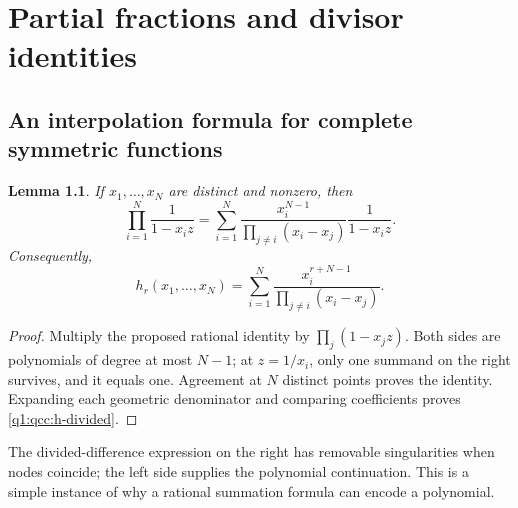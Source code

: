 \documentclass[11pt,a4paper,oneside,openany]{book}
\newtheorem{lemma}[theorem]{Lemma}
\theoremstyle{definition}
\theoremstyle{remark}
\begin{document}
\chapter{Partial fractions and divisor identities}
\label{q1:qcc:divisor}
\section{An interpolation formula for complete symmetric functions}
\begin{lemma}\label{q1:qcc:partial-fraction}
If \(x_1,\ldots,x_N\) are distinct and nonzero, then
\begin{equation}\label{q1:qcc:partial-fraction-formula}
 \prod_{i=1}^N\frac1{1-x_i z}
 =\sum_{i=1}^N\frac{x_i^{N-1}}{\prod_{j\ne i}(x_i-x_j)}\frac1{1-x_i z}.
\end{equation}
Consequently,
\begin{equation}\label{q1:qcc:h-divided}
 h_r(x_1,\ldots,x_N)
 =\sum_{i=1}^N\frac{x_i^{r+N-1}}{\prod_{j\ne i}(x_i-x_j)}.
\end{equation}
\end{lemma}
\begin{proof}
Multiply the proposed rational identity by \(\prod_j(1-x_jz)\).
Both sides are polynomials of degree at most \(N-1\); at \(z=1/x_i\), only
one summand on the right survives, and it equals one. Agreement at \(N\)
distinct points proves the identity. Expanding each geometric denominator and
comparing coefficients proves \eqref{q1:qcc:h-divided}.
\end{proof}
The divided-difference expression on the right has removable singularities when
nodes coincide; the left side supplies the polynomial continuation. This is a
simple instance of why a rational summation formula can encode a polynomial.
\end{document}
